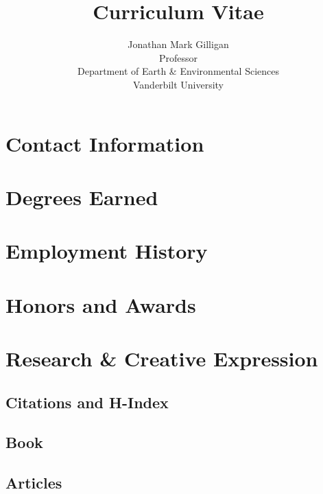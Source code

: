\documentclass[10pt]{article}
\title{Curriculum Vitae}
\date{\thedate}
\author{Jonathan Mark Gilligan\\
\normalsize Professor\\
Department of Earth \& Environmental Sciences\\
Vanderbilt University}
\begin{document}
\maketitle
\tableofcontents

\section{Contact Information}


\section{Degrees Earned}
\begin{description}
  
\end{description}
\section{Employment History}


\section{Honors and Awards}


\section{Research \& Creative Expression}
    \subsection{Citations and H-Index}
    
    \nocite{*}%
  \subsection[Book]{Book}
        \begin{refsection}
            \nocite{*}
            \printbibliography[heading=none,type=book]
        \end{refsection}
  \subsection[Articles]{Articles}
    \begin{refsection}
        \nocite{*}
        \printbibliography[heading=none,type=article]
    \end{refsection}
\end{document}
